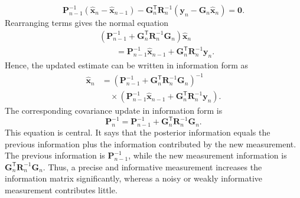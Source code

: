 \documentclass{ieeeaccess}
\begin{document}
\begin{equation}
\mathbf{P}_{n-1}^{-1}
\left(
\widehat{\mathbf{x}}_n
-
\widehat{\mathbf{x}}_{n-1}
\right)
-
\mathbf{G}_n^{\mathsf T}
\mathbf{R}_n^{-1}
\left(
\mathbf{y}_n
-
\mathbf{G}_n
\widehat{\mathbf{x}}_n
\right)
=
\mathbf{0}.
\end{equation}
Rearranging terms gives the normal equation
\begin{align*}
&\left(\mathbf{P}_{n-1}^{-1}+\mathbf{G}_n^{\mathsf T}\mathbf{R}_n^{-1}\mathbf{G}_n\right)\widehat{\mathbf{x}}_n\\
&\qquad=
\mathbf{P}_{n-1}^{-1}\widehat{\mathbf{x}}_{n-1}
+\mathbf{G}_n^{\mathsf T}\mathbf{R}_n^{-1}\mathbf{y}_n.
\end{align*}
Hence, the updated estimate can be written in information form as
\begin{equation}
\begin{aligned}
\widehat{\mathbf{x}}_n
&=
\left(
\mathbf{P}_{n-1}^{-1}
+
\mathbf{G}_n^{\mathsf T}
\mathbf{R}_n^{-1}
\mathbf{G}_n
\right)^{-1}\\
&\quad{}\times
\left(
\mathbf{P}_{n-1}^{-1}
\widehat{\mathbf{x}}_{n-1}
+
\mathbf{G}_n^{\mathsf T}
\mathbf{R}_n^{-1}
\mathbf{y}_n
\right).
\end{aligned}
\end{equation}
The corresponding covariance update in information form is
\begin{equation}
\mathbf{P}_n^{-1}
=
\mathbf{P}_{n-1}^{-1}
+
\mathbf{G}_n^{\mathsf T}
\mathbf{R}_n^{-1}
\mathbf{G}_n.
\end{equation}
This equation is central. It says that the posterior information equals the previous information plus the information contributed by the new measurement. The previous information is $\mathbf{P}_{n-1}^{-1}$, while the new measurement information is $\mathbf{G}_n^{\mathsf T}\mathbf{R}_n^{-1}\mathbf{G}_n$. Thus, a precise and informative measurement increases the information matrix significantly, whereas a noisy or weakly informative measurement contributes little.
\end{document}
